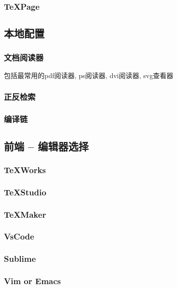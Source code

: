 \documentclass[12pt]{article}
\begin{document}
\subsubsection{TeXPage}



\subsection{本地配置}
\subsubsection{文档阅读器}
包括最常用的pdf阅读器, ps阅读器, dvi阅读器, svg查看器 
\subsubsection{正反检索}
\subsubsection{编译链}




\subsection{前端 -- 编辑器选择}
\subsubsection{TeXWorks}

\subsubsection{TeXStudio}

\subsubsection{TeXMaker}

\subsubsection{VsCode}

\subsubsection{Sublime}

\subsubsection{Vim or Emacs}
\end{document}
